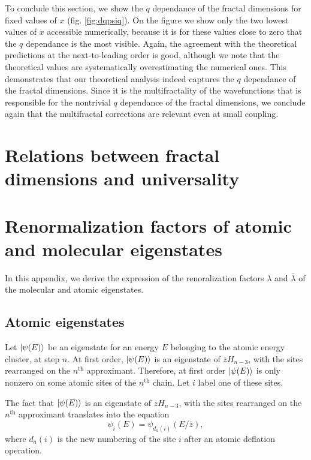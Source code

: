 \documentclass[aps,prl,preprint]{revtex4-1}
\newcommand{\zb}{\ensuremath{\overline{z}}}
\begin{document}
To conclude this section, we show the $q$ dependance of the fractal dimensions for fixed values of $x$ (fig. \eqref{fig:dqpsiq}).
On the figure we show only the two lowest values of $x$ accessible numerically, because it is for these values close to zero that the $q$ dependance is the most visible. 
Again, the agreement with the theoretical predictions at the next-to-leading order is good, although we note that the theoretical values are systematically overestimating the numerical ones.
This demonstrates that our theoretical analysis indeed captures the $q$ dependance of the fractal dimensions.
Since it is the multifractality of the wavefunctions that is responsible for the nontrivial $q$ dependance of the fractal dimensions, we conclude again that the multifractal corrections are relevant even at small coupling.

\section{Relations between fractal dimensions and universality}

\newpage
\appendix

\section{Renormalization factors of atomic and molecular eigenstates}
\label{app:renorm}

In this appendix, we derive the expression of the renoralization factors $\lambda$ and $\bar \lambda$ of the molecular and atomic eigenstates.

\subsection{Atomic eigenstates}

Let $\ket{\psi(E)}$ be an eigenstate for an energy $E$ belonging to the atomic energy cluster, at step $n$.
At first order, $\ket{\psi(E)}$ is an eigenstate of $\zb H_{n-3}$, with the sites rearranged on the $n^\text{th}$ approximant.
Therefore, at first order $\ket{\psi(E)}$ is only nonzero on some atomic sites of the $n^\text{th}$ chain. Let $i$ label one of these sites.

The fact that $\ket{\psi(E)}$ is an eigenstate of $\zb H_{n-3}$, with the sites rearranged on the $n^\text{th}$ approximant translates into the equation
\begin{equation}
\label{eq:renorm_a_first}
	\psi_i(E) = \psi_{d_a(i)}(E/\bar z),
\end{equation}
where $d_a(i)$ is the new numbering of the site $i$ after an atomic deflation operation.
\end{document}
